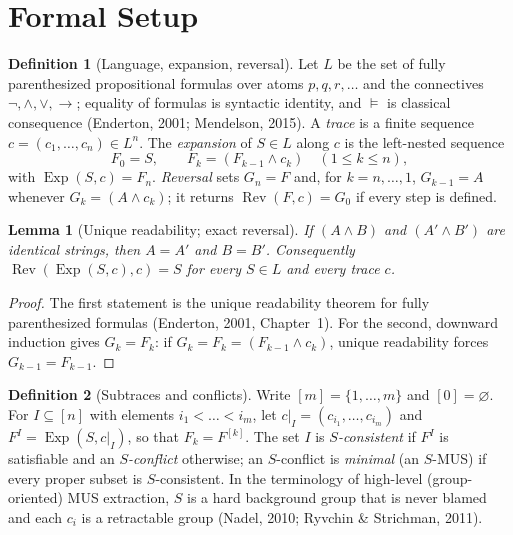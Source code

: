 \documentclass[11pt,reqno]{amsart}
\theoremstyle{plain}
\newtheorem{lemma}{Lemma}
\theoremstyle{definition}
\newtheorem{definition}{Definition}
\DeclareMathOperator{\Exp}{Exp}
\DeclareMathOperator{\Rev}{Rev}
\begin{document}
\section{Formal Setup}
\begin{definition}[Language, expansion, reversal]
Let $L$ be the set of fully parenthesized propositional formulas over atoms
$p,q,r,\dots$ and the connectives $\neg,\wedge,\vee,\rightarrow$; equality of
formulas is syntactic identity, and $\vDash$ is classical consequence (Enderton,
2001; Mendelson, 2015). A \emph{trace} is a finite sequence
$c=(c_1,\dots,c_n)\in L^n$. The \emph{expansion} of $S\in L$ along $c$ is the
left-nested sequence
\begin{equation}
F_0=S,\qquad F_k=(F_{k-1}\wedge c_k)\quad(1\le k\le n),
\end{equation}
with $\Exp(S,c)=F_n$. \emph{Reversal} sets $G_n=F$ and, for $k=n,\dots,1$,
$G_{k-1}=A$ whenever $G_k=(A\wedge c_k)$; it returns $\Rev(F,c)=G_0$ if every step
is defined.
\end{definition}

\begin{lemma}[Unique readability; exact reversal]
If $(A\wedge B)$ and $(A'\wedge B')$ are identical strings, then $A=A'$ and
$B=B'$. Consequently $\Rev(\Exp(S,c),c)=S$ for every $S\in L$ and every trace $c$.
\end{lemma}
\begin{proof}
The first statement is the unique readability theorem for fully parenthesized
formulas (Enderton, 2001, Chapter~1). For the second, downward induction gives
$G_k=F_k$: if $G_k=F_k=(F_{k-1}\wedge c_k)$, unique readability forces
$G_{k-1}=F_{k-1}$.
\end{proof}

\begin{definition}[Subtraces and conflicts]
Write $[m]=\{1,\dots,m\}$ and $[0]=\varnothing$. For $I\subseteq[n]$ with elements
$i_1<\dots<i_m$, let $c|_I=(c_{i_1},\dots,c_{i_m})$ and $F^I=\Exp(S,c|_I)$, so that
$F_k=F^{[k]}$. The set $I$ is \emph{$S$-consistent} if $F^I$ is satisfiable and an
\emph{$S$-conflict} otherwise; an $S$-conflict is \emph{minimal} (an $S$-MUS) if
every proper subset is $S$-consistent. In the terminology of high-level
(group-oriented) MUS extraction, $S$ is a hard background group that is never
blamed and each $c_i$ is a retractable group (Nadel, 2010; Ryvchin \& Strichman,
2011).
\end{definition}
\end{document}
